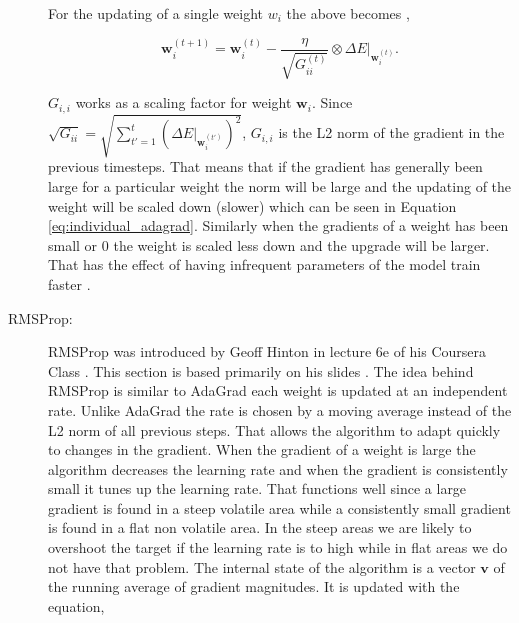 \begin{description}
        For the updating of a single weight $w_i$ the above becomes
        \citep{Duchi:2011:ASM:1953048.2021068},

        \begin{equation}
            \label{eq:individual_adagrad}
            \mathbf{w}_i^{(t+1)} =
                \mathbf{w}_i^{(t)} - \frac{\eta}{\sqrt{G^{(t)}_{ii}}} \otimes
                \Delta E|_{\mathbf{w}_i^{(t)}}.
        \end{equation}

        $G_{i,i}$ works as a scaling factor for weight $\mathbf{w}_i$.
        Since $\sqrt{G_{ii}} = \sqrt{\sum_{t'=1}^t \left(\Delta
        E|_{\mathbf{w}^{(t')}_i}\right)^2}$, $G_{i,i}$ is the L2 norm
        of the gradient in the previous timesteps. That means that if the
        gradient has generally been large for a particular weight the norm
        will be large and the updating of the weight will be scaled down
        (slower) which can be seen in Equation \eqref{eq:individual_adagrad}.
        Similarly when the gradients of a weight has been small or 0 the
        weight is scaled less down and the upgrade will be larger. That has
        the effect of having infrequent parameters of the model train faster
        \citep{Duchi:2011:ASM:1953048.2021068}.


    \item[\gls{RMSProp}:]

        \gls{RMSProp} was introduced by Geoff Hinton in lecture 6e of his
        Coursera Class \citep{DBLP:journals/corr/Ruder16}. This section is based
        primarily on his slides \citep{HintonSrivastavaSwersky2014}. The idea
        behind \gls{RMSProp} is similar to \gls{AdaGrad} each weight is updated
        at an independent rate. Unlike \gls{AdaGrad} the rate is chosen by a
        moving average instead of the L2 norm of all previous steps. That allows
        the algorithm to adapt quickly to changes in the gradient. When the
        gradient of a weight is large the algorithm decreases the learning rate
        and when the gradient is consistently small it tunes up the learning
        rate. That functions well since a large gradient is found in a steep
        volatile area while a consistently small gradient is found in a flat non
        volatile area. In the steep areas we are likely to overshoot the target
        if the learning rate is to high while in flat areas we do not have that
        problem. The internal state of the algorithm is a vector $\mathbf{v}$
        of the running average of gradient magnitudes. It is updated with the
        equation,


\end{description}

